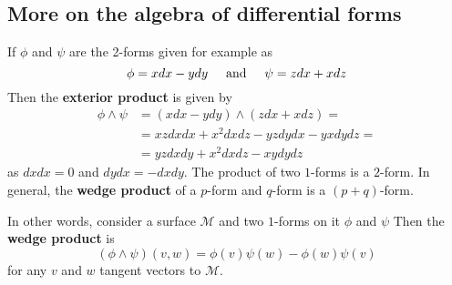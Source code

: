 {    %
    
    \subsection{More on the algebra of differential forms}
    
    If $\phi$ and $\psi$ are the 2-forms given for example as 
    \begin{equation}
    \phi = x dx - y dy \hspace{5mm} \text{and} \hspace{5mm}\psi = z dx + x dz
    \end{equation}
    Then the \textbf{exterior product} is given by 
    \begin{align}
    \phi\wedge\psi &= (x dx - y dy)\wedge(zdx + xdz) = \\
    &=xzdxdx+x^2dxdz-yzdydx-yxdydz= \\
    &=yzdxdy + x^2 dx dz - xydydz
    \end{align}
    as $dxdx=0$ and $dydx=-dxdy$. 
    The product of two $1$-forms is a $2$-form.
    In general, the \textbf{wedge product} of a $p$-form and $q$-form is a $(p+q)$-form.
    
    In other words, consider a surface $\mathcal{M}$ and two $1$-forms on it $\phi$ and $\psi$ Then the \textbf{wedge product} is 
    \begin{equation}
    (\phi\wedge\psi)(v,w)=\phi(v)\psi(w) - \phi(w)\psi(v)
    \end{equation}
    for any $v$ and $w$ tangent vectors to $\mathcal{M}$.
    
}
